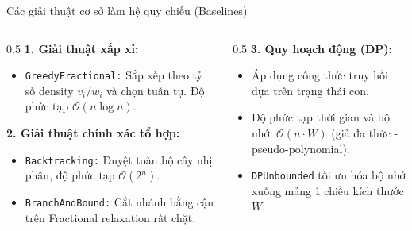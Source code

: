 \documentclass[10pt]{beamer}
\begin{document}
\begin{frame}{Các giải thuật cơ sở làm hệ quy chiếu (Baselines)}
    \begin{columns}
        \begin{column}{0.5\textwidth}
            \textbf{1. Giải thuật xấp xỉ:}
            \begin{itemize}
                \item \texttt{GreedyFractional:} Sắp xếp theo tỷ số density $v_i / w_i$ và chọn tuần tự. Độ phức tạp $\mathcal{O}(n \log n)$.
            \end{itemize}
            \textbf{2. Giải thuật chính xác tổ hợp:}
            \begin{itemize}
                \item \texttt{Backtracking:} Duyệt toàn bộ cây nhị phân, độ phức tạp $\mathcal{O}(2^n)$.
                \item \texttt{BranchAndBound:} Cắt nhánh bằng cận trên Fractional relaxation rất chặt.
            \end{itemize}
        \end{column}
        \begin{column}{0.5\textwidth}
            \textbf{3. Quy hoạch động (DP):}
            \begin{itemize}
                \item Áp dụng công thức truy hồi dựa trên trạng thái con.
                \item Độ phức tạp thời gian và bộ nhớ: $\mathcal{O}(n \cdot W)$ (giả đa thức - pseudo-polynomial).
                \item \texttt{DPUnbounded} tối ưu hóa bộ nhớ xuống mảng 1 chiều kích thước $W$.
            \end{itemize}
        \end{column}
    \end{columns}
\end{frame}
\end{document}
